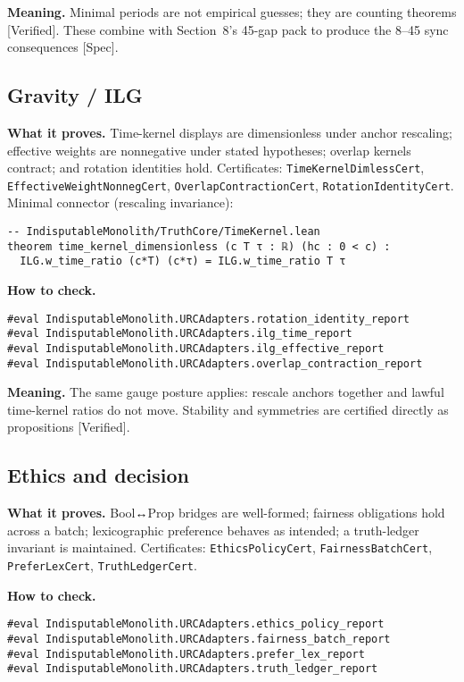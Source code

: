 \documentclass[11pt,a4paper,twoside]{article}
\numberwithin{equation}{section}
\theoremstyle{customthm}
\theoremstyle{customdef}
\theoremstyle{customrem}
\begin{document}
\textbf{Meaning.} Minimal periods are not empirical guesses; they are counting theorems [Verified]. These combine with Section~8's 45-gap pack to produce the 8–45 sync consequences [Spec].

\subsection{Gravity / ILG}

\textbf{What it proves.} Time-kernel displays are dimensionless under anchor rescaling; effective weights are nonnegative under stated hypotheses; overlap kernels contract; and rotation identities hold. Certificates: \texttt{TimeKernelDimlessCert}, \texttt{EffectiveWeightNonnegCert}, \texttt{OverlapContractionCert}, \texttt{RotationIdentityCert}. Minimal connector (rescaling invariance):

\begin{lstlisting}
-- IndisputableMonolith/TruthCore/TimeKernel.lean
theorem time_kernel_dimensionless (c T τ : ℝ) (hc : 0 < c) :
  ILG.w_time_ratio (c*T) (c*τ) = ILG.w_time_ratio T τ
\end{lstlisting}

\textbf{How to check.}

\begin{lstlisting}
#eval IndisputableMonolith.URCAdapters.rotation_identity_report
#eval IndisputableMonolith.URCAdapters.ilg_time_report
#eval IndisputableMonolith.URCAdapters.ilg_effective_report
#eval IndisputableMonolith.URCAdapters.overlap_contraction_report
\end{lstlisting}

\textbf{Meaning.} The same gauge posture applies: rescale anchors together and lawful time-kernel ratios do not move. Stability and symmetries are certified directly as propositions [Verified].

\subsection{Ethics and decision}

\textbf{What it proves.} Bool↔Prop bridges are well-formed; fairness obligations hold across a batch; lexicographic preference behaves as intended; a truth-ledger invariant is maintained. Certificates: \texttt{EthicsPolicyCert}, \texttt{FairnessBatchCert}, \texttt{PreferLexCert}, \texttt{TruthLedgerCert}.

\textbf{How to check.}

\begin{lstlisting}
#eval IndisputableMonolith.URCAdapters.ethics_policy_report
#eval IndisputableMonolith.URCAdapters.fairness_batch_report
#eval IndisputableMonolith.URCAdapters.prefer_lex_report
#eval IndisputableMonolith.URCAdapters.truth_ledger_report
\end{lstlisting}
\end{document}
